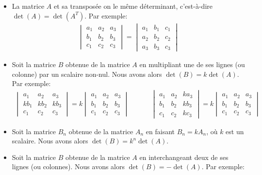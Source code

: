 \documentclass[]{book}
\providecommand{\tightlist}{%
  \setlength{\itemsep}{0pt}\setlength{\parskip}{0pt}}
\theoremstyle{definition}
\theoremstyle{definition}
\theoremstyle{definition}
\theoremstyle{remark}
\begin{document}
\begin{itemize}
\tightlist
\item
  La matrice \(A\) et sa transposée on le même déterminant, c'est-à-dire \(\det(A) = \det(A^T)\). Par exemple:
  \begin{align*}
  \begin{vmatrix}
  a_1 & a_2 & a_3 \\
  b_1 & b_2 & b_3 \\
  c_1 & c_2 & c_3
  \end{vmatrix}
  =
  \begin{vmatrix}
  a_1 & b_1 & c_1 \\
  a_2 & b_2 & c_2 \\
  a_3 & b_3 & c_3
  \end{vmatrix}
  \end{align*}
\item
  Soit la matrice \(B\) obtenue de la matrice \(A\) en multipliant une de ses lignes (ou colonne) par un scalaire non-nul. Nous avons alors \(\det(B)=k\det(A)\). Par exemple:
  \begin{align*}
  \begin{vmatrix}
  a_1 & a_2 & a_3 \\
  kb_1 & kb_2 & kb_3 \\
  c_1 & c_2 & c_3
  \end{vmatrix}
  =
  k\begin{vmatrix}
  a_1 & a_2 & a_3 \\
  b_1 & b_2 & b_3 \\
  c_1 & c_2 & c_3
  \end{vmatrix}
  &
  \phantom{aaa}
  &
  \begin{vmatrix}
  a_1 & a_2 & ka_3 \\
  b_1 & b_2 & kb_3 \\
  c_1 & c_2 & kc_3
  \end{vmatrix}
  =k\begin{vmatrix}
  a_1 & a_2 & a_3 \\
  b_1 & b_2 & b_3 \\
  c_1 & c_2 & c_3
  \end{vmatrix}
  \end{align*}
\item
  Soit la matrice \(B_n\) obtenue de la matrice \(A_n\) en faisant \(B_n=kA_n\), où \(k\) est un scalaire. Nous avons alors \(\det(B)=k^n\det(A)\).
\item
  Soit la matrice \(B\) obtenue de la matrice \(A\) en interchangeant deux de ses lignes (ou colonnes). Nous avons alors \(\det(B)=-\det(A)\). Par exemple:

\end{itemize}
\end{document}
